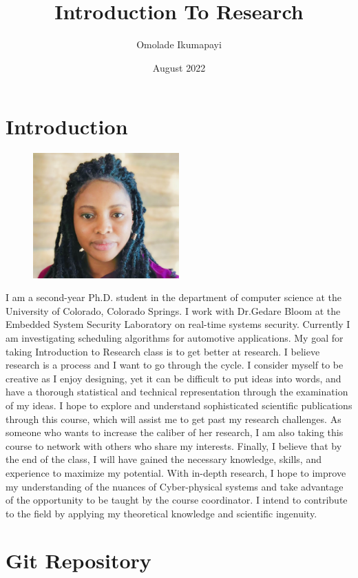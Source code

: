 \documentclass{article}
\title{Introduction To Research}
\author{Omolade Ikumapayi}
\date{August 2022}
\begin{document}
\maketitle

\section{Introduction}

\begin{figure}[h!]
  \centering
  \includegraphics[width=0.5\textwidth]{omolade_.jpg}
\end{figure}

I am a second-year Ph.D. student in the department of computer science at the University of Colorado, Colorado Springs. I work with Dr.Gedare Bloom at the Embedded System Security Laboratory on real-time systems security. Currently I am investigating scheduling algorithms for automotive applications. My goal for taking Introduction to Research class is to get better at research. I believe research is a process and I want to go through the cycle. I consider myself to be creative as I enjoy designing, yet it can be difficult to put ideas into words, and have a thorough statistical and technical representation through the examination of my ideas.
I hope to explore and understand sophisticated scientific publications through this course, which will assist me to get past my research challenges. As someone who wants to increase the caliber of her research, I am also taking this course to network with others who share my interests.
Finally, I believe that by the end of the class, I will have gained the necessary knowledge, skills, and experience to  maximize my potential. With in-depth research, I hope to improve my understanding of the nuances of Cyber-physical systems and take advantage of the opportunity to be taught by the course coordinator. I intend to contribute to the field by applying my theoretical knowledge and scientific ingenuity.
\section{Git Repository}
\end{document}
